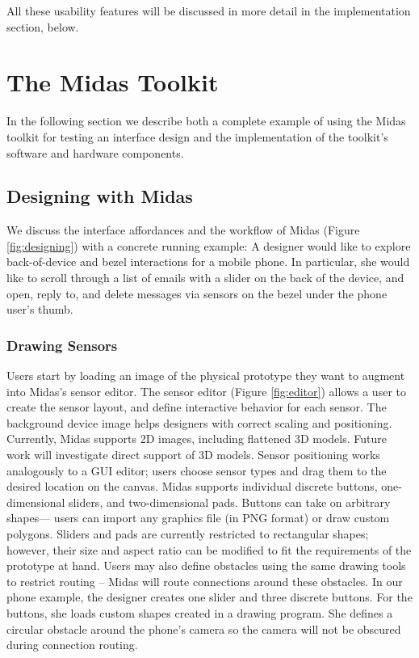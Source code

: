 All these usability features will be discussed in more detail in the implementation section, below.

\section{The Midas Toolkit}

In the following section we describe both a complete example of using the Midas toolkit for testing an interface design and the implementation of the toolkit's software and hardware components.

\subsection{Designing with Midas}

We discuss the interface affordances and the
workflow of Midas (Figure \ref{fig:designing}) with a concrete running example:
A designer would like to explore back-of-device and
bezel interactions for a mobile phone. In particular, she
would like to scroll through a list of emails with a slider on
the back of the device, and open, reply to, and delete messages
via sensors on the bezel under the phone user’s thumb.

\subsubsection{Drawing Sensors}
Users start by loading an image of the physical prototype
they want to augment into Midas’s sensor editor. The sensor
editor (Figure \ref{fig:editor}) allows a user to create the sensor layout, and
define interactive behavior for each sensor. The background
device image helps designers with correct scaling and positioning.
Currently, Midas supports 2D images, including
flattened 3D models. Future work will investigate direct support
of 3D models. Sensor positioning works analogously
to a GUI editor; users choose sensor types and drag them to the desired location on the canvas. Midas supports individual
discrete buttons, one-dimensional sliders, and two-dimensional
pads. Buttons can take on arbitrary shapes—
users can import any graphics file (in PNG format) or draw
custom polygons. Sliders and pads are currently restricted
to rectangular shapes; however, their size and aspect ratio
can be modified to fit the requirements of the prototype at
hand. Users may also define obstacles using the same drawing
tools to restrict routing -- Midas will route connections
around these obstacles.
In our phone example, the designer creates one slider and
three discrete buttons. For the buttons, she loads custom
shapes created in a drawing program. She defines a circular
obstacle around the phone’s camera so the camera will
not be obscured during connection routing.



